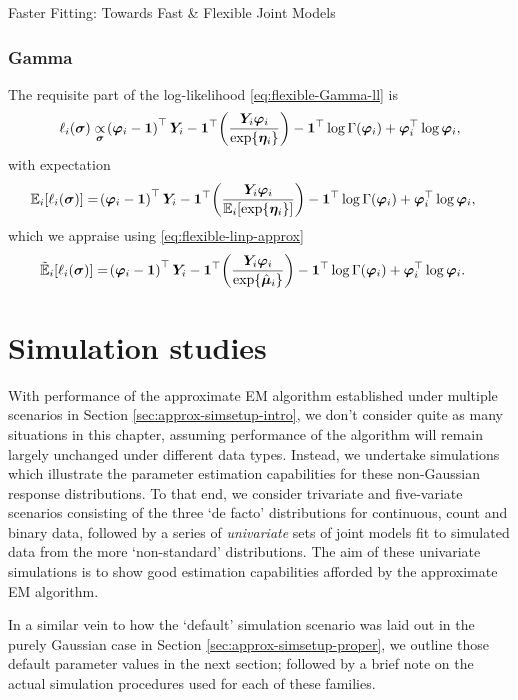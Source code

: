 \begin{chapter}{\label{cha:flexible}Faster Fitting: Towards Fast \& Flexible Joint Models}
\subsubsection{Gamma}
The requisite part of the log-likelihood \eqref{eq:flexible-Gamma-ll} is
\begin{align*}
    \ell_i\!\left(\bm{\sigma}\right)\underset{\bm{\sigma}}{\propto}\!\left(\bm{\varphi}_i-\bm{1}\right)^\top\bm{Y}_i-\bm{1}^\top\!\left(\frac{\bm{Y}_i\bm{\varphi}_i}{\exp\!\left\{\bm{\eta}_i\right\}}\right)-\bm{1}^\top\log\Gamma\!\left(\bm{\varphi}_i\right)+\bm{\varphi}_i^\top\log\bm{\varphi}_i,
\end{align*}
with expectation
\begin{align*}
    \mathbb{E}_i\!\left[\ell_i\!\left(\bm{\sigma}\right)\right]&=\!\left(\bm{\varphi}_i-\bm{1}\right)^\top\bm{Y}_i-\bm{1}^\top\!\left(\frac{\bm{Y}_i\bm{\varphi}_i}{\mathbb{E}_i\!\left[\exp\!\left\{\bm{\eta}_i\right\}\right]}\right)-\bm{1}^\top\log\Gamma\!\left(\bm{\varphi}_i\right)+\bm{\varphi}_i^\top\log\bm{\varphi}_i,
\end{align*}
which we appraise using \eqref{eq:flexible-linp-approx}
\begin{equation}
    \begin{aligned}
        \tilde{\mathbb{E}}_i\!\left[\ell_i\!\left(\bm{\sigma}\right)\right]&=\!\left(\bm{\varphi}_i-\bm{1}\right)^\top\bm{Y}_i-\bm{1}^\top\!\left(\frac{\bm{Y}_i\bm{\varphi}_i}{\exp\!\left\{\hat{\bm{\mu}}_i\right\}}\right)-\bm{1}^\top\log\Gamma\!\left(\bm{\varphi}_i\right)+\bm{\varphi}_i^\top\log\bm{\varphi}_i.
    \end{aligned}
\label{eq:flexible-Mstep-sigma-Gamma}
\end{equation}
\resettocmain
\section{Simulation studies}\label{sec:flexible-simsetup-intro}
With performance of the approximate EM algorithm established under multiple scenarios in Section \ref{sec:approx-simsetup-intro}, we don't consider quite as many situations in this chapter, assuming performance of the algorithm will remain largely unchanged under different data types. Instead, we undertake simulations which illustrate the parameter estimation capabilities for these non-Gaussian response distributions. To that end, we consider trivariate and five-variate scenarios consisting of the three `de facto' distributions for continuous, count and binary data, followed by a series of \textit{univariate} sets of joint models fit to simulated data from the more `non-standard' distributions. The aim of these univariate simulations is to show good estimation capabilities afforded by the approximate EM algorithm.

In a similar vein to how the `default' simulation scenario was laid out in the purely Gaussian case in Section \ref{sec:approx-simsetup-proper}, we outline those default parameter values in the next section; followed by a brief note on the actual simulation procedures used for each of these families.


\end{chapter}
